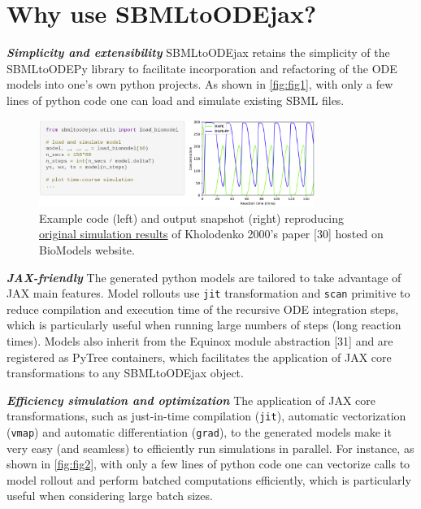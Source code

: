 \documentclass[
]{article}
\begin{document}
\hypertarget{why-use-sbmltoodejax}{%
\section{Why use SBMLtoODEjax?}\label{why-use-sbmltoodejax}}

\textbf{\emph{Simplicity and extensibility}} SBMLtoODEjax retains the
simplicity of the SBMLtoODEPy library to facilitate incorporation and
refactoring of the ODE models into one's own python projects. As shown
in \autoref{fig:fig1}, with only a few lines of python code one can load
and simulate existing SBML files.

\begin{figure}
\centering
\includegraphics[width=0.8\textwidth,height=\textheight]{fig1.png}
\caption{Example code (left) and output snapshot (right) reproducing
\href{https://www.ebi.ac.uk/biomodels/BIOMD0000000010\#Curation}{original
simulation results} of Kholodenko 2000's paper {[}30{]} hosted on
BioModels website. \label{fig:fig1}}
\end{figure}

\textbf{\emph{JAX-friendly}} The generated python models are tailored to
take advantage of JAX main features. Model rollouts use \texttt{jit}
transformation and \texttt{scan} primitive to reduce compilation and
execution time of the recursive ODE integration steps, which is
particularly useful when running large numbers of steps (long reaction
times). Models also inherit from the Equinox module abstraction {[}31{]}
and are registered as PyTree containers, which facilitates the
application of JAX core transformations to any SBMLtoODEjax object.

\textbf{\emph{Efficiency simulation and optimization}} The application
of JAX core transformations, such as just-in-time compilation
(\texttt{jit}), automatic vectorization (\texttt{vmap}) and automatic
differentiation (\texttt{grad}), to the generated models make it very
easy (and seamless) to efficiently run simulations in parallel. For
instance, as shown in \autoref{fig:fig2}, with only a few lines of
python code one can vectorize calls to model rollout and perform batched
computations efficiently, which is particularly useful when considering
large batch sizes.
\end{document}
